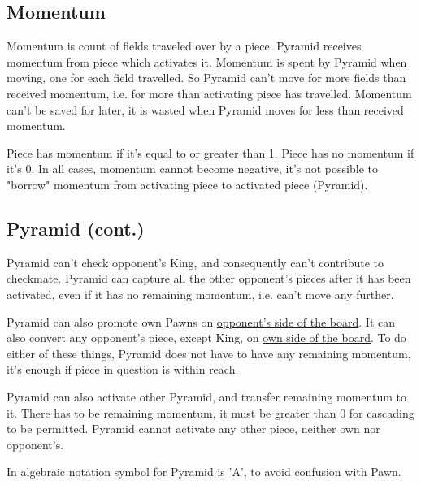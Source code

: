 \subsection*{Momentum}
\label{sec:Mayan Ascendancy/Pyramid/Momentum}

Momentum is count of fields traveled over by a piece. Pyramid receives
momentum from piece which activates it. Momentum is spent by Pyramid when
moving, one for each field travelled. So Pyramid can't move for more
fields than received momentum, i.e. for more than activating piece has
travelled. Momentum can't be saved for later, it is wasted when Pyramid
moves for less than received momentum.

Piece has momentum if it's equal to or greater than 1. Piece has no momentum
if it's 0. In all cases, momentum cannot become negative, it's not possible
to "borrow" momentum from activating piece to activated piece (Pyramid).

\clearpage %

\subsection*{Pyramid (cont.)}
\label{sec:Mayan Ascendancy/Pyramid/Pyramid (cont.)}

Pyramid can't check opponent's King, and consequently can't contribute to
checkmate. Pyramid can capture all the other opponent's pieces after it has
been activated, even if it has no remaining momentum, i.e. can't move any
further.

Pyramid can also promote own Pawns on
\hyperref[sec:Definitions/Sides of a chessboard]{opponent's side of the board}.
It can also convert any opponent's piece, except King, on
\hyperref[sec:Definitions/Sides of a chessboard]{own side of the board}.
To do either of these things, Pyramid does not have to have any remaining
momentum, it's enough if piece in question is within reach.

Pyramid can also activate other Pyramid, and transfer remaining momentum to it.
There has to be remaining momentum, it must be greater than 0 for cascading
to be permitted. Pyramid cannot activate any other piece, neither own nor
opponent's.

In algebraic notation symbol for Pyramid is 'A', to avoid confusion with Pawn.

\clearpage %

